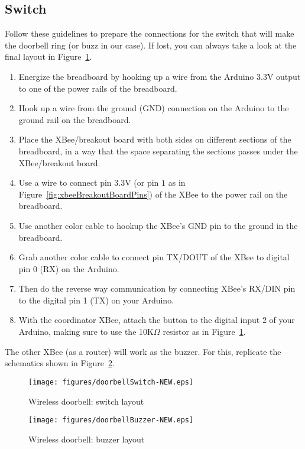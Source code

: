 \subsection{Switch}
Follow these guidelines to prepare the connections for the switch that will make the doorbell ring (or buzz in our case). If lost, you can always take a look at the final layout in Figure~\ref{fig:wirelessDoorbellSwitch}.

\begin{enumerate}
  \item Energize the breadboard by hooking up a {\color{red}{red}} wire from the Arduino $3.3$V output to one of the power rails of the breadboard.
  \item Hook up a {\color{blue}{blue}} wire from the ground (GND) connection on the Arduino to the ground rail on the breadboard.
  \item Place the XBee/breakout board with both sides on different sections of the breadboard, in a way that the space separating the sections passes under the XBee/breakout board.
  \item Use a {\color{red}{red}} wire to connect pin $3.3$V (or pin $1$ as in Figure~\ref{fig:xbeeBreakoutBoardPins}) of the XBee to the power rail on the breadboard.
  \item Use another color cable to hookup the XBee's GND pin to the ground in the breadboard.
  \item Grab another color cable to connect pin TX/DOUT of the XBee to digital pin 0 (RX) on the Arduino.
  \item Then do the reverse way communication by connecting XBee's RX/DIN pin to the digital pin 1 (TX) on your Arduino.
  \item With the coordinator XBee, attach the button to the digital input 2 of your Arduino, making sure to use the 10K$\Omega$ resistor as in Figure~\ref{fig:wirelessDoorbellSwitch}.
\end{enumerate}

The other XBee (as a router) will work as the buzzer. For this, replicate the schematics shown in Figure~\ref{fig:wirelessDoorbellBuzzer}.

\begin{figure}[htbp]
  \centering
  \texttt{[image: figures/doorbellSwitch-NEW.eps]}
  \caption{Wireless doorbell: switch layout
  \label{fig:wirelessDoorbellSwitch}}
\end{figure}

\begin{figure}[htbp]
  \centering
  \texttt{[image: figures/doorbellBuzzer-NEW.eps]}
  \caption{Wireless doorbell: buzzer layout
  \label{fig:wirelessDoorbellBuzzer}}
\end{figure}

